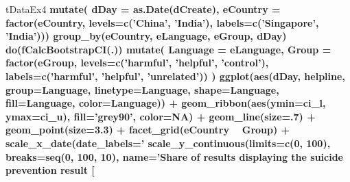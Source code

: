 \documentclass[]{article}
\newenvironment{Shaded}{\begin{snugshade}}{\end{snugshade}}
\newcommand{\CharTok}[1]{\textcolor[rgb]{0.31,0.60,0.02}{#1}}
\newcommand{\DataTypeTok}[1]{\textcolor[rgb]{0.13,0.29,0.53}{#1}}
\newcommand{\DecValTok}[1]{\textcolor[rgb]{0.00,0.00,0.81}{#1}}
\newcommand{\FloatTok}[1]{\textcolor[rgb]{0.00,0.00,0.81}{#1}}
\newcommand{\KeywordTok}[1]{\textcolor[rgb]{0.13,0.29,0.53}{\textbf{#1}}}
\newcommand{\NormalTok}[1]{#1}
\newcommand{\OperatorTok}[1]{\textcolor[rgb]{0.81,0.36,0.00}{\textbf{#1}}}
\newcommand{\OtherTok}[1]{\textcolor[rgb]{0.56,0.35,0.01}{#1}}
\newcommand{\StringTok}[1]{\textcolor[rgb]{0.31,0.60,0.02}{#1}}
\begin{document}
\begin{Shaded}
\begin{Highlighting}[]
{{{{{{{{{{{{{{{{{{{{{{{{{{{{{\NormalTok{tDataEx4 }\OperatorTok{%>%}
\StringTok{  }\KeywordTok{mutate}\NormalTok{(}
    \DataTypeTok{dDay =} \KeywordTok{as.Date}\NormalTok{(dCreate),}
    \DataTypeTok{eCountry =} \KeywordTok{factor}\NormalTok{(eCountry,}
                      \DataTypeTok{levels=}\KeywordTok{c}\NormalTok{(}\StringTok{'China'}\NormalTok{, }\StringTok{'India'}\NormalTok{),}
                      \DataTypeTok{labels=}\KeywordTok{c}\NormalTok{(}\StringTok{'Singapore'}\NormalTok{, }\StringTok{'India'}\NormalTok{))) }\OperatorTok{%>%}
\StringTok{  }\KeywordTok{group_by}\NormalTok{(eCountry, eLanguage, eGroup, dDay) }\OperatorTok{%>%}
\StringTok{  }\KeywordTok{do}\NormalTok{(}\KeywordTok{fCalcBootstrapCI}\NormalTok{(.)) }\OperatorTok{%>%}
\StringTok{  }\KeywordTok{mutate}\NormalTok{(}
    \DataTypeTok{Language =}\NormalTok{ eLanguage,}
    \DataTypeTok{Group =} \KeywordTok{factor}\NormalTok{(eGroup, }
                   \DataTypeTok{levels=}\KeywordTok{c}\NormalTok{(}\StringTok{'harmful'}\NormalTok{, }\StringTok{'helpful'}\NormalTok{, }\StringTok{'control'}\NormalTok{),}
                   \DataTypeTok{labels=}\KeywordTok{c}\NormalTok{(}\StringTok{'harmful'}\NormalTok{, }\StringTok{'helpful'}\NormalTok{, }\StringTok{'unrelated'}\NormalTok{))}
\NormalTok{  ) }\OperatorTok{%>%}
\StringTok{  }\KeywordTok{ggplot}\NormalTok{(}\KeywordTok{aes}\NormalTok{(dDay, helpline, }\DataTypeTok{group=}\NormalTok{Language, }\DataTypeTok{linetype=}\NormalTok{Language, }\DataTypeTok{shape=}\NormalTok{Language, }\DataTypeTok{fill=}\NormalTok{Language, }\DataTypeTok{color=}\NormalTok{Language)) }\OperatorTok{+}
\StringTok{    }\KeywordTok{geom_ribbon}\NormalTok{(}\KeywordTok{aes}\NormalTok{(}\DataTypeTok{ymin=}\NormalTok{ci_l, }\DataTypeTok{ymax=}\NormalTok{ci_u), }\DataTypeTok{fill=}\StringTok{'grey90'}\NormalTok{, }\DataTypeTok{color=}\OtherTok{NA}\NormalTok{) }\OperatorTok{+}
\StringTok{    }\KeywordTok{geom_line}\NormalTok{(}\DataTypeTok{size=}\NormalTok{.}\DecValTok{7}\NormalTok{) }\OperatorTok{+}
\StringTok{    }\KeywordTok{geom_point}\NormalTok{(}\DataTypeTok{size=}\FloatTok{3.3}\NormalTok{) }\OperatorTok{+}
\StringTok{    }\KeywordTok{facet_grid}\NormalTok{(eCountry }\OperatorTok{~}\StringTok{ }\NormalTok{Group) }\OperatorTok{+}
\StringTok{    }\KeywordTok{scale_x_date}\NormalTok{(}\DataTypeTok{date_labels=}\StringTok{'%m/%d'}\NormalTok{, }\DataTypeTok{date_breaks=}\StringTok{'1 day'}\NormalTok{, }\DataTypeTok{name=}\StringTok{'Date'}\NormalTok{) }\OperatorTok{+}
\StringTok{    }\KeywordTok{scale_y_continuous}\NormalTok{(}\DataTypeTok{limits=}\KeywordTok{c}\NormalTok{(}\DecValTok{0}\NormalTok{, }\DecValTok{100}\NormalTok{), }\DataTypeTok{breaks=}\KeywordTok{seq}\NormalTok{(}\DecValTok{0}\NormalTok{, }\DecValTok{100}\NormalTok{, }\DecValTok{10}\NormalTok{), }\DataTypeTok{name=}\StringTok{'Share of results displaying the suicide prevention result [%]}\CharTok{\textbackslash{}n}\StringTok{ '}\NormalTok{) }\OperatorTok{+}
}}}}}}}}}}}}}}}}}}}}}}}}}}}}}}}}}}}}
\end{Highlighting}
\end{Shaded}
\end{document}
